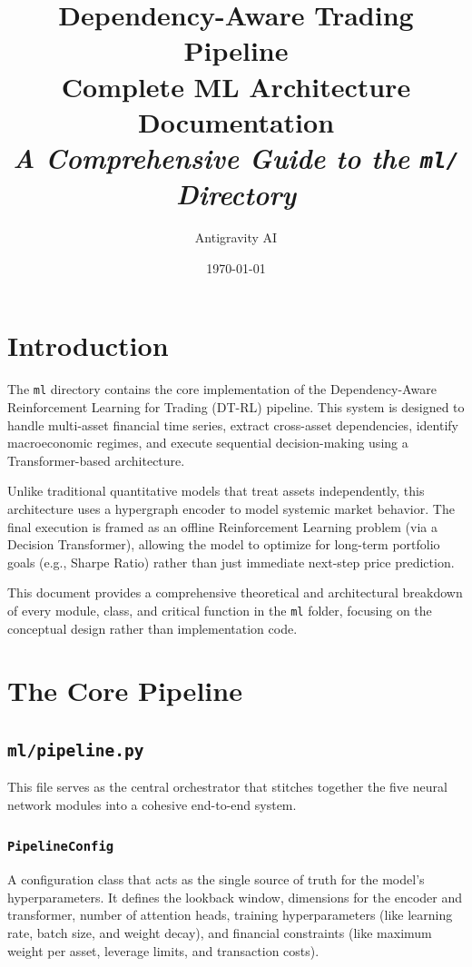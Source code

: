 \documentclass[12pt,a4paper]{report}
\title{
    \Huge \textbf{Dependency-Aware Trading Pipeline}\\
    \vspace{1cm}
    \LARGE \textbf{Complete ML Architecture Documentation}\\
    \vspace{0.5cm}
    \large \textit{A Comprehensive Guide to the \texttt{ml/} Directory}
}
\author{Antigravity AI}
\date{\today}
\begin{document}
\maketitle

\tableofcontents
\newpage

\chapter{Introduction}
\onehalfspacing

The \texttt{ml} directory contains the core implementation of the Dependency-Aware Reinforcement Learning for Trading (DT-RL) pipeline. This system is designed to handle multi-asset financial time series, extract cross-asset dependencies, identify macroeconomic regimes, and execute sequential decision-making using a Transformer-based architecture.

Unlike traditional quantitative models that treat assets independently, this architecture uses a hypergraph encoder to model systemic market behavior. The final execution is framed as an offline Reinforcement Learning problem (via a Decision Transformer), allowing the model to optimize for long-term portfolio goals (e.g., Sharpe Ratio) rather than just immediate next-step price prediction.

This document provides a comprehensive theoretical and architectural breakdown of every module, class, and critical function in the \texttt{ml} folder, focusing on the conceptual design rather than implementation code.

\chapter{The Core Pipeline}

\section{\texttt{ml/pipeline.py}}
This file serves as the central orchestrator that stitches together the five neural network modules into a cohesive end-to-end system.

\subsection{\texttt{PipelineConfig}}
A configuration class that acts as the single source of truth for the model's hyperparameters. It defines the lookback window, dimensions for the encoder and transformer, number of attention heads, training hyperparameters (like learning rate, batch size, and weight decay), and financial constraints (like maximum weight per asset, leverage limits, and transaction costs).
\end{document}
